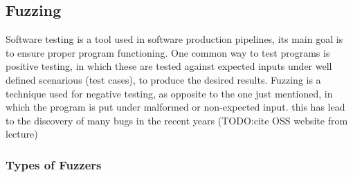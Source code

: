 










\subsection{Fuzzing}

Software testing is a tool used in software production pipelines, its main goal is to ensure proper program functioning. One common way to test programs is 
positive testing, in which these are tested against expected inputs under well defined scenarious (test cases), to produce the desired results.
Fuzzing is a technique used for negative testing, as opposite to the one just mentioned, in which the program is put under malformed or non-expected input. this
has lead to the discovery of many bugs in the recent years (TODO:\@ cite OSS website from lecture)

\subsubsection{Types of Fuzzers}
 
